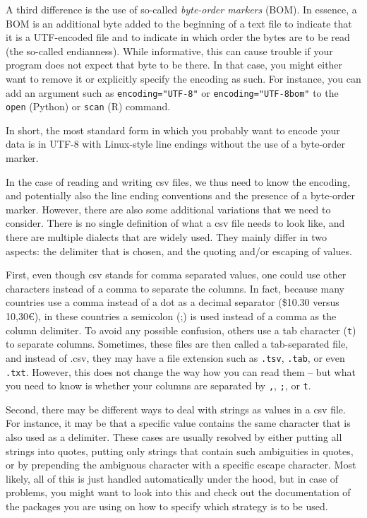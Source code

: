 A third difference is the use of so-called \emph{byte-order markers} (BOM). In essence, a BOM is an additional byte added to the beginning of a text file to indicate that it is a UTF-encoded file and to indicate in which order the bytes are to be read (the so-called endianness). While informative, this can cause trouble if your program does not expect that byte to be there. In that case, you might either want to remove it or explicitly specify the encoding as such. For instance, you can add an argument such as \texttt{encoding="UTF-8"} or \texttt{encoding="UTF-8bom"} to the \texttt{open} (Python) or \texttt{scan} (R) command.


In short, the most standard form in which you probably want to encode your data is in UTF-8 with Linux-style line endings without the use of a byte-order marker.


In the case of reading and writing csv files, we thus need to know the encoding, and potentially also the line ending conventions and the presence of a byte-order marker. However, there are also some additional variations that we need to consider. There is no single definition of what a csv file needs to look like, and there are multiple dialects that are widely used. They mainly differ in two aspects: the delimiter that is chosen, and the quoting and/or escaping of values.

First, even though csv stands for comma separated values, one could use other characters instead of a comma to separate the columns. In fact, because many countries use a comma instead of a dot  as a decimal separator (\$10.30 versus 10,30€), in these countries a semicolon (;) is used instead of a comma as the column delimiter.
To avoid any possible confusion, others use a tab character (\verb+t+) to separate columns.
Sometimes, these files are then called a tab-separated file, and instead of .csv,
they may have a file extension such as \verb|.tsv|, \verb|.tab|, or even \verb|.txt|.
However, this does not change the way how you can read them -- but what you need to know is whether your columns are separated by
\texttt{,}, \texttt{;}, or \verb|t|.

Second, there may be different ways  to deal with strings as values in a csv file. For instance, it may be that a specific value contains the same character that is also used as a delimiter. These cases are usually resolved by either putting all strings into quotes, putting only strings that contain such ambiguities in quotes, or by prepending the ambiguous character with a specific escape character. Most likely, all of this is just handled automatically under the hood, but in case of problems, you might want to look into this and check out the documentation of the packages you are using on how to specify which strategy is to be used.

